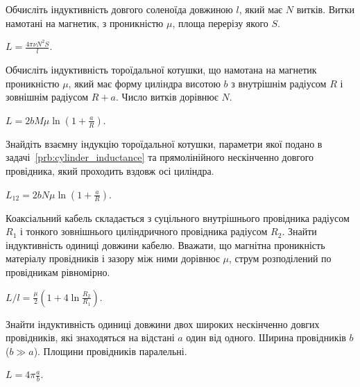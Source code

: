 \begin{problem}
    Обчисліть індуктивність довгого соленоїда довжиною $l$, який має $N$ витків. Витки намотані на магнетик, з проникністю $\mu$, площа перерізу якого $S$. 
\begin{solution}
	$L = \frac{4\pi\nu N^2 S}{l}$.
\end{solution}
\end{problem}

\begin{problem}\label{prb:cylinder_inductance}
    Обчисліть індуктивність тороїдальної котушки, що намотана на магнетик проникністю $\mu$, який має форму циліндра висотою $b$ з внутрішнім радіусом $R$ і зовнішнім радіусом $R + a$. Число витків дорівнює $N$.
\begin{solution}
	$L  = 2bM\mu\ln\left( 1 + \frac{a}{R}\right) $.
\end{solution}
\end{problem}

\begin{problem}
    Знайдіть взаємну індукцію тороїдальної котушки, параметри якої подано в задачі~\ref{prb:cylinder_inductance} та прямолінійного нескінченно довгого провідника, який проходить вздовж осі циліндра.
\begin{solution}
	$L_{12} = 2bN\mu \ln\left( 1 + \frac{a}{R}\right) $.
\end{solution}
\end{problem}

\begin{problem}%
Коаксіальний кабель складається з суцільного внутрішнього провідника радіусом $R_1$ і тонкого зовнішнього циліндричного провідника радіусом $R_2$. Знайти індуктивність одиниці довжини кабелю. Вважати, що магнітна проникність матеріалу провідників і зазору між ними дорівнює $\mu$, струм розподілений по провідникам рівномірно.
\begin{solution}
	$L/l = \frac{\mu}{2} \left( 1 + 4\ln\frac{R_2}{R_1}\right)$.
\end{solution}
\end{problem}

\begin{problem}\label{prb:inductance_two_plates}
Знайти індуктивність одиниці довжини двох широких нескінченно довгих провідників, які знаходяться на відстані $a$ один від одного. Ширина провідників $b$ ($b \gg a$). Площини провідників паралельні.
\begin{solution}
	$L = 4\pi\frac{a}{b}$.
\end{solution}
\end{problem}

